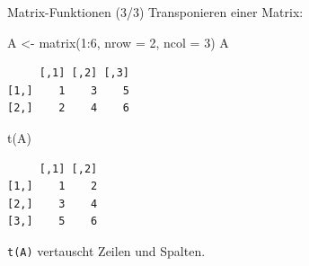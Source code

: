 \documentclass[
  10pt,
  ignorenonframetext,
  aspectratio=169,
]{beamer}
\newenvironment{Shaded}{}{}
\newcommand{\AttributeTok}[1]{\textcolor[rgb]{0.49,0.56,0.16}{#1}}
\newcommand{\DecValTok}[1]{\textcolor[rgb]{0.25,0.63,0.44}{#1}}
\newcommand{\FunctionTok}[1]{\textcolor[rgb]{0.02,0.16,0.49}{#1}}
\newcommand{\NormalTok}[1]{#1}
\newcommand{\OtherTok}[1]{\textcolor[rgb]{0.00,0.44,0.13}{#1}}
\newcommand{\SpecialCharTok}[1]{\textcolor[rgb]{0.25,0.44,0.63}{#1}}
\begin{document}
\begin{frame}[fragile]{Matrix-Funktionen (3/3)}
\label{matrix-funktionen-33}
Transponieren einer Matrix:

\begin{Shaded}
\begin{Highlighting}[]
\NormalTok{A }\OtherTok{\textless{}{-}} \FunctionTok{matrix}\NormalTok{(}\DecValTok{1}\SpecialCharTok{:}\DecValTok{6}\NormalTok{, }\AttributeTok{nrow =} \DecValTok{2}\NormalTok{, }\AttributeTok{ncol =} \DecValTok{3}\NormalTok{)}
\NormalTok{A}
\end{Highlighting}
\end{Shaded}

\begin{verbatim}
     [,1] [,2] [,3]
[1,]    1    3    5
[2,]    2    4    6
\end{verbatim}

\begin{Shaded}
\begin{Highlighting}[]
\FunctionTok{t}\NormalTok{(A)}
\end{Highlighting}
\end{Shaded}

\begin{verbatim}
     [,1] [,2]
[1,]    1    2
[2,]    3    4
[3,]    5    6
\end{verbatim}

\texttt{t(A)} vertauscht Zeilen und Spalten.
\end{frame}
\end{document}
